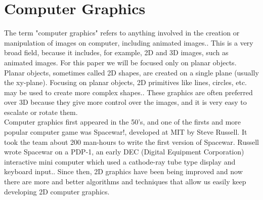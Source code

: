 \documentclass[conference]{IEEEtran}
\begin{document}
\section{Computer Graphics}
The term "computer graphics" refers to anything involved in the creation or manipulation
of images on computer, including animated images.\cite{ComputerGraphics}. This is a very broad field, because it includes, for example, 2D and 3D images, such as animated images. For this paper we will be focused only on planar objects. Planar objects, sometimes called 2D shapes, are created on a single plane (usually the xy-plane). Focusing on planar objects, 2D primitives like lines, circles, etc. may be used to create more complex shapes.\cite{2DGraphics}. These graphics are often preferred over 3D because they give more control over the images, and it is very easy to escalate or rotate them.\\
Computer graphics first appeared in the 50's, and one of the firsts and more popular computer game was Spacewar!, developed at MIT by Steve Russell. It took the team about 200 man-hours to write the first version of Spacewar. Russell wrote Spacewar on a PDP-1, an early DEC (Digital Equipment Corporation) interactive mini computer which used a cathode-ray tube type display and keyboard input.\cite{SpaceWar}. Since then, 2D graphics have been being improved and now there are more and better algorithms and techniques that allow us easily keep developing 2D computer graphics.
\end{document}
